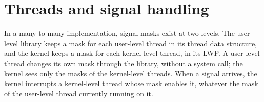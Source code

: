 \documentclass[../main.tex]{subfiles}
\begin{document}
\section{Threads and signal handling}
\label{sec:l05-thread-signals}

In a many-to-many implementation, signal masks exist at two
levels.  The user-level library keeps a mask for each
user-level thread in its thread data structure, and the kernel keeps a
mask for each kernel-level thread, in its LWP.  A user-level thread changes
its own mask through the library, without a system call; the kernel sees
only the masks of the kernel-level threads.  When a signal arrives, the
kernel interrupts a kernel-level thread whose mask enables it, whatever the
mask of the user-level thread currently running on it.
\end{document}
